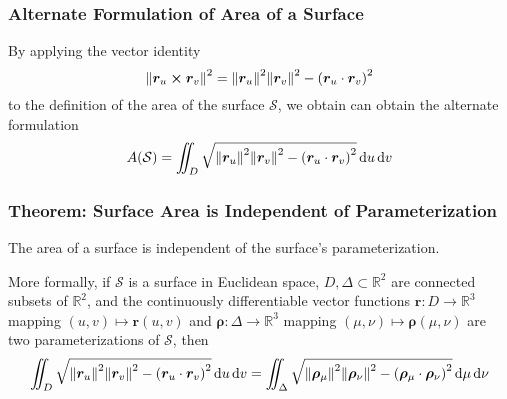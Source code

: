 \documentclass[11pt, a4paper]{article}
\newcommand{\diff}{\mathop{}\!\mathrm{d}} %
\begin{document}
\subsubsection{Alternate Formulation of Area of a Surface}
By applying the vector identity
\begin{equation*}
	\norm{\bm{r}_u \cross \bm{r}_v}^2 = \norm{\bm{r}_u}^2 \norm{\bm{r}_v}^2 - \left(\bm{r}_u \cdot \bm{r}_v\right)^2
\end{equation*}
to the definition of the area of the surface $ \mathcal{S} $, we obtain can obtain the alternate formulation
\begin{equation*}
	A(\mathcal{S}) = \iint_D \sqrt{\norm{\bm{r}_u}^2 \norm{\bm{r}_v}^2 - \left(\bm{r}_u \cdot \bm{r}_v\right)^2} \diff u \diff v
\end{equation*}

\subsubsection{Theorem: Surface Area is Independent of Parameterization}
The area of a surface is independent of the surface's parameterization.

More formally, if $ \mathcal{S} $ is a surface in Euclidean space, $ D, \Delta \subset \mathbb{R}^2 $ are connected subsets of $ \mathbb{R}^2 $, and the continuously differentiable vector functions $ \bm{r} : D \rightarrow \mathbb{R}^3 $ mapping $ (u, v) \mapsto \bm{r}(u, v) $ and $ \bm{\rho} : \Delta \rightarrow \mathbb{R}^3 $ mapping $ (\mu, \nu) \mapsto \bm{\rho}(\mu, \nu) $ are two parameterizations of $ \mathcal{S} $, then
\begin{equation*}
\iint_D \sqrt{\norm{\bm{r}_u}^2 \norm{\bm{r}_v}^2 - \left(\bm{r}_u \cdot \bm{r}_v\right)^2} \diff u \diff v =  \iint_\Delta \sqrt{\norm{\bm{\rho}_\mu}^2 \norm{\bm{\rho}_\nu}^2 - \left(\bm{\rho}_\mu \cdot \bm{\rho}_\nu\right)^2} \diff \mu \diff \nu
\end{equation*}
\end{document}
